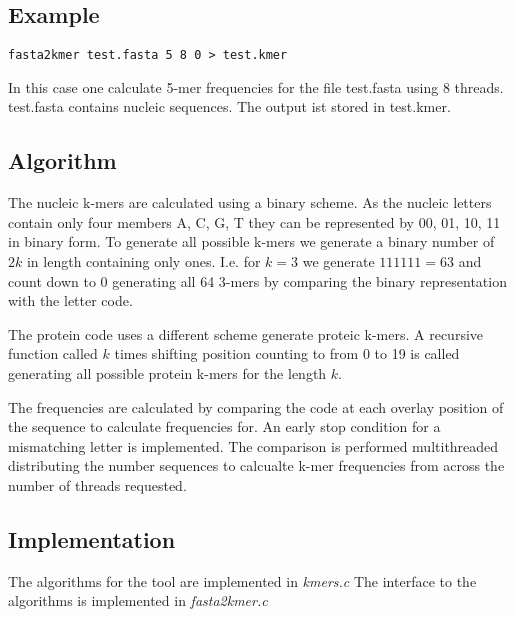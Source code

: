 \subsection{Example}

\begin{lstlisting}
fasta2kmer test.fasta 5 8 0 > test.kmer
\end{lstlisting}
In this case one calculate 5-mer frequencies for the file test.fasta
using 8 threads. test.fasta contains nucleic sequences. The output ist
stored in test.kmer.

\subsection{Algorithm}

The nucleic k-mers are calculated using a binary scheme. As the
nucleic letters contain only four members A, C, G, T they can be
represented by 00, 01, 10, 11 in binary form. To generate all possible
k-mers we generate a binary number of $2k$ in length containing only
ones. I.e. for $k=3$ we generate $111 111 = 63$ and count down to $0$
generating all 64 3-mers by comparing the binary representation with
the letter code.

The protein code uses a different scheme generate proteic k-mers.
A recursive function called $k$ times shifting position counting to
from 0 to 19 is called generating all possible protein k-mers for the
length $k$.

The frequencies are calculated by comparing the code at each overlay
position of the sequence to calculate frequencies for. An early stop
condition for a mismatching letter is implemented. The comparison is
performed multithreaded distributing the number sequences to
calcualte k-mer frequencies from across the number of threads
requested.

\subsection{Implementation}

The algorithms for the tool are implemented in \emph{kmers.c}
The interface to the algorithms is implemented in \emph{fasta2kmer.c}
